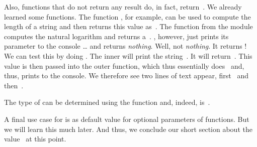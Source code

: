 Also, functions that do not return any result do, in fact, return~.
We already learned some functions.
The function , for example, can be used to compute the length of a string and then returns this value as~.
The function  from the  module computes the natural logarithm and returns a~.
, however, just prints its parameter to the console {\dots} and returns \emph{nothing}.
Well, not \emph{nothing}.
It returns !
We can test this by doing .
The inner  will print the string~.
It will return~.
This value  is then passed into the outer  function, which thus essentially does~ and, thus, prints  to the console.
We therefore see two lines of text appear, first~ and then~.

The type of  can be determined using the  function and, indeed, is~.

A final use case for  is as default value for optional parameters of functions.
But we will learn this much later.
And thus, we conclude our short section about the value~ at this point.%
%
\endhsection%
%
